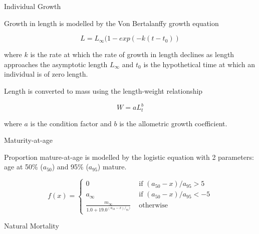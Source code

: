 \documentclass[preprint,review,12pt]{elsarticle}
\begin{document}
Individual Growth

Growth in length is modelled by the Von Bertalanffy growth equation \cite{vonbert1957quantitative}

\begin{equation} L = L_\infty(1 - exp(-k(t-t_0)) \end{equation}
         
where $k$ is the rate at which the rate of growth in length declines as length approaches the asymptotic length  $L_\infty$ and $t_{0}$ is the hypothetical time at which an individual is of zero length.

Length is converted to mass using the length-weight relationship 
    
\begin{equation} W = aL_t^b \end{equation}

\noindent where $a$ is the condition factor and $b$ is the allometric growth coefficient.


Maturity-at-age

Proportion mature-at-age is modelled by the logistic equation with 2 parameters: age at 50\% ($a_{50}$) and 95\% ($a_{95}$) mature.

\begin{equation}
f(x) = \left\{ \begin{array}{ll}
			0                                 &\mbox{ if $(a_{50}-x)/a_{95} >  5$} \\
			a_{\infty}                        &\mbox{ if $(a_{50}-x)/a_{95} < -5$} \\
			\frac{m_{\infty}}{1.0+19.0^{(a_{50}-x)/_{95})}} &\mbox{ otherwise}
		\end{array}
       \right.
\end{equation}

Natural Mortality
\end{document}
